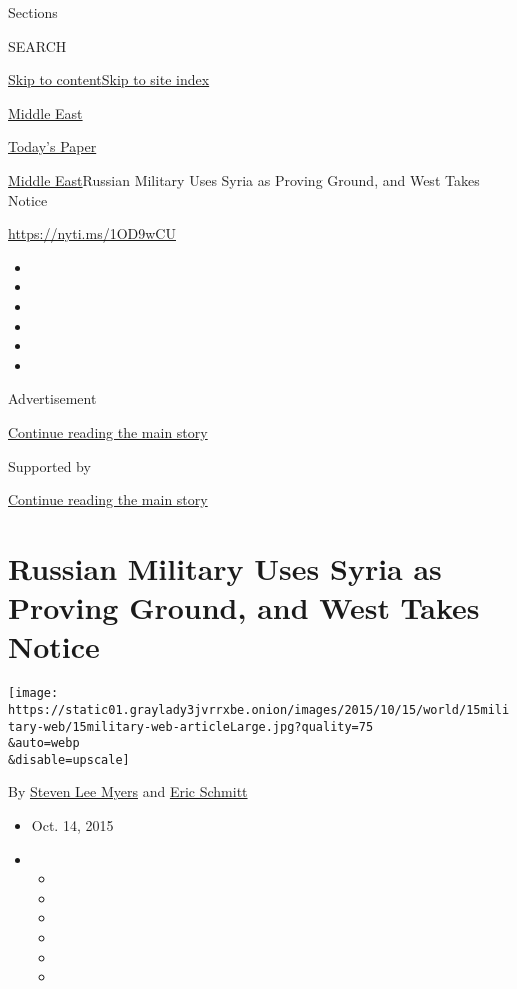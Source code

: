 Sections

SEARCH

\protect\hyperlink{site-content}{Skip to
content}\protect\hyperlink{site-index}{Skip to site index}

\href{https://www.nytimes3xbfgragh.onion/section/world/middleeast}{Middle
East}

\href{https://myaccount.nytimes3xbfgragh.onion/auth/login?response_type=cookie\&client_id=vi}{}

\href{https://www.nytimes3xbfgragh.onion/section/todayspaper}{Today's
Paper}

\href{/section/world/middleeast}{Middle East}\textbar{}Russian Military
Uses Syria as Proving Ground, and West Takes Notice

\url{https://nyti.ms/1OD9wCU}

\begin{itemize}
\item
\item
\item
\item
\item
\item
\end{itemize}

Advertisement

\protect\hyperlink{after-top}{Continue reading the main story}

Supported by

\protect\hyperlink{after-sponsor}{Continue reading the main story}

\hypertarget{russian-military-uses-syria-as-proving-ground-and-west-takes-notice}{%
\section{Russian Military Uses Syria as Proving Ground, and West Takes
Notice}\label{russian-military-uses-syria-as-proving-ground-and-west-takes-notice}}

\texttt{[image: https://static01.graylady3jvrrxbe.onion/images/2015/10/15/world/15military-web/15military-web-articleLarge.jpg?quality=75\\\&auto=webp\\\&disable=upscale]}

By \href{http://www.nytimes3xbfgragh.onion/by/steven-lee-myers}{Steven
Lee Myers} and
\href{http://www.nytimes3xbfgragh.onion/by/eric-schmitt}{Eric Schmitt}

\begin{itemize}
\item
  Oct. 14, 2015
\item
  \begin{itemize}
  \item
  \item
  \item
  \item
  \item
  \item
  \end{itemize}
\end{itemize}

